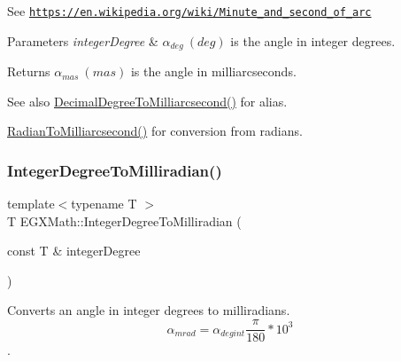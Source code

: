 See \href{https://en.wikipedia.org/wiki/Minute_and_second_of_arc}{\tt https\+://en.\+wikipedia.\+org/wiki/\+Minute\+\_\+and\+\_\+second\+\_\+of\+\_\+arc} 
\begin{DoxyParams}{Parameters}
{\em integer\+Degree} & $\alpha_{deg}\ (deg)$ is the angle in integer degrees. \\
\hline
\end{DoxyParams}
\begin{DoxyReturn}{Returns}
$\alpha_{mas}\ (mas)$ is the angle in milliarcseconds. 
\end{DoxyReturn}
\begin{DoxySeeAlso}{See also}
\mbox{\hyperlink{group___e_g_x_math-_angle_conversions-_decimal_degree_gadb9ff3c92cf7484793f91e7de80c222e}{Decimal\+Degree\+To\+Milliarcsecond()}} for alias. 

\mbox{\hyperlink{group___e_g_x_math-_angle_conversions-_radian_ga84fbb494a455cfeb30be62776f96c9a9}{Radian\+To\+Milliarcsecond()}} for conversion from radians. 
\end{DoxySeeAlso}
\mbox{\label{group___e_g_x_math-_angle_conversions-_integer_degree_ga5379a68bdff5cc4fab5bb1ba06ef9453}} 
\subsubsection{\texorpdfstring{Integer\+Degree\+To\+Milliradian()}{IntegerDegreeToMilliradian()}}
{\footnotesize\ttfamily template$<$typename T $>$ \\
T E\+G\+X\+Math\+::\+Integer\+Degree\+To\+Milliradian (\begin{DoxyParamCaption}\item[{const T \&}]{integer\+Degree }\end{DoxyParamCaption})}



Converts an angle in integer degrees to milliradians. \[\alpha_{mrad}=\alpha_{degint}\frac{\pi}{180}*10^3\]. 

